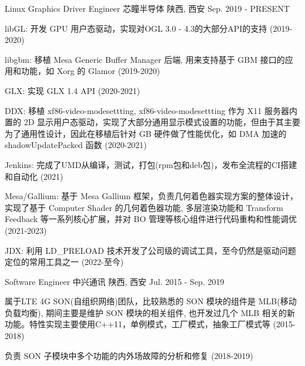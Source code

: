 
\begin{cventries}
  \cventry
    {Linux Graphics Driver Engineer} %
    {芯瞳半导体} %
    {陕西, 西安} %
    {Sep. 2019 - PRESENT} %
    {
      \begin{cvitems} %
        \item {libGL: 开发 GPU 用户态驱动，实现对OGL 3.0 - 4.3的大部分API的支持 (2019-2020)}
        \item {libgbm: 移植 Mesa Generic Buffer Manager 后端, 用来支持基于 GBM 接口的应用和功能，如 Xorg 的 Glamor (2019-2020)}
        \item {GLX: 实现 GLX 1.4 API (2020-2021)}
        \item {DDX: 移植 xf86-video-modesettting, xf86-video-modesettting 作为 X11 服务器内置的 2D 显示用户态驱动，实现了大部分通用显示模式设置的功能，但由于其主要为了通用性设计，因此在移植后针对 GB 硬件做了性能优化，如 DMA 加速的 shadowUpdatePacked 函数 (2020-2021)}
        \item {Jenkins: 完成了UMD从编译，测试，打包(rpm包和deb包)，发布全流程的CI搭建和自动化 (2021)}
        \item {Mesa/Gallium: 基于 Mesa Gallium 框架，负责几何着色器实现方案的整体设计，实现了基于 Computer Shader 的几何着色器功能, 多层渲染功能和 Transform Feedback 等一系列核心扩展，并对 BO 管理等核心组件进行代码重构和性能调优 (2021-2023)}
        \item {JDX: 利用 LD\_PRELOAD 技术开发了公司级的调试工具，至今仍然是驱动问题定位的常用工具之一 (2022-至今)}
      \end{cvitems}
    }

  \cventry
    {Software Engineer} %
    {中兴通讯} %
    {陕西, 西安} %
    {Jul. 2015 - Sep. 2019} %
    {
      \begin{cvitems} %
      \item {属于LTE 4G SON(自组织网络)团队，比较熟悉的 SON 模块的组件是 MLB(移动负载均衡), 期间主要是维护 SON 模块的相关组件, 也开发过几个 MLB 相关的新功能。特性实现主要使用C++11，单例模式，工厂模式，抽象工厂模式等 (2015-2018)}
      \item {负责 SON 子模块中多个功能的内外场故障的分析和修复 (2018-2019)}
      \end{cvitems}
    }
\end{cventries}
